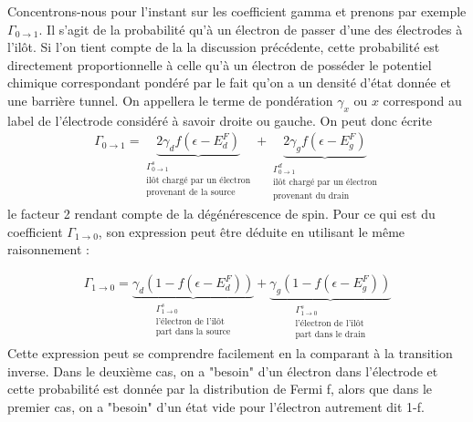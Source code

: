 \newpage 

Concentrons-nous pour l'instant sur les coefficient gamma et prenons par exemple $\Gamma_{0 \rightarrow 1}$. Il s'agit de la probabilité qu'à un électron de passer d'une des électrodes à l'il\^ot. Si l'on tient compte de la la discussion précédente, cette probabilité est directement proportionnelle à celle qu'à un électron de posséder le potentiel chimique correspondant pondéré par le fait qu'on a un densité d'état donnée et une barrière tunnel. On appellera le terme de pondération $\gamma_x$ ou $x$ correspond au label de l'électrode considéré à savoir droite ou gauche. On peut donc écrite 
\begin{eqnarray}
\Gamma_{0 \rightarrow 1} = 
\underbrace{2\gamma_d f(\epsilon - E_d^F)}_{\substack{{\Gamma_{0 \rightarrow 1}^s}\\\text{il\^ot chargé par un électron}\\\text{provenant de la source}}}
+ 
\underbrace{2\gamma_g f(\epsilon - E_g^F)}_{\substack{{\Gamma_{0 \rightarrow 1}^d}\\\text{il\^ot chargé par un électron}\\\text{provenant du drain}}}
\end{eqnarray}
le facteur 2 rendant compte de la dégénérescence de spin. Pour ce qui est du coefficient $\Gamma_{1 \rightarrow 0}$, son expression peut être déduite en utilisant le même raisonnement :

\begin{eqnarray}
\Gamma_{1 \rightarrow 0} = 
\underbrace{\gamma_d (1 - f(\epsilon - E_d^F))}_{\substack{{\Gamma_{1 \rightarrow 0}^s}\\\text{l'électron de l'il\^ot}\\\text{part dans la source}}}
+ 
\underbrace{\gamma_g (1 - f(\epsilon - E_g^F))}_{\substack{{\Gamma_{1 \rightarrow 0}^s}\\\text{l'électron de l'il\^ot}\\\text{part dans le drain}}}
\end{eqnarray}
Cette expression peut se comprendre facilement en la comparant à la transition inverse. Dans le deuxième cas, on a "besoin" d'un électron dans l'électrode et cette probabilité est donnée par la distribution de Fermi f, alors que dans le premier cas, on a "besoin" d'un état vide pour l'électron autrement dit 1-f.

